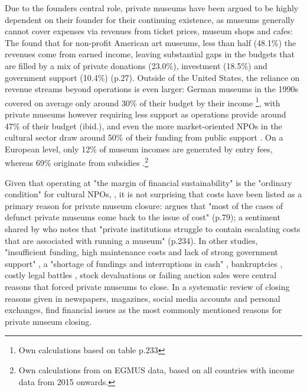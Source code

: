 \documentclass[12pt]{article}
\begin{document}
Due to the founders central role, private museums have been argued to be highly dependent on their founder for their continuing existence, as museums generally cannot cover expenses via revenues from ticket prices, museum shops and cafes:
The \textcite{IMLS_2008_funding} found that for non-profit American art museums, less than half (48.1\%) the revenues come from earned income, leaving substantial gaps in the budgets that are filled by a mix of private donations (23.0\%), investment (18.5\%) and government support (10.4\%) (p.27).
Outside of the United States, the reliance on revenue streams beyond operations is even larger:
German museums in the 1990s covered on average only around 30\% of their budget by their income \parencite{Martin_1993_museen}\footnote{Own calculations based on table p.233}, with private museums however requiring less support as operations provide around 47\% of their budget (ibid.), and even the more market-oriented NPOs in the cultural sector draw around 50\% of their funding from public support \parencite[p.82]{Zimmer_Priller_2007_gemeinnuetzig}.
On a European level, only 12\% of museum incomes are generated by entry fees, whereas 69\% originate from subsidies \parencite{EGMUS_2024_complete}.\footnote{Own calculations from on EGMUS data, based on all countries with income data from 2015 onwards.}


Given that operating at "the margin of financial sustainability" is the "ordinary condition" for cultural NPOs, \parencite[p.2]{Licci_BaraldiBonini_2024_sustainability}, it is not surprising that costs have been listed as a primary reason for private museum closure:
\textcite{Adam_2021_rise} argues that "most of the cases of defunct private museums come back to the issue of cost" (p.79); a sentiment shared by \textcite{Walker_2019_collector} who notes that "private institutions struggle to contain escalating costs that are associated with running a museum" (p.234).
In other studies, "insufficient funding, high maintenance costs and lack of strong government support" \parencite[p.7]{Zennaro_2017_shanghai}, a "shortage of fundings and interruptions in cash" \parencite[p.45]{Song_2008_private}, bankruptcies \parencite{Velthuis_Gera_2024_fragility,Liu_2019_identities,DeNigris_2018_museums}, costly legal battles \parencite{Velthuis_Gera_2024_fragility}, stock devaluations \parencite{Walker_2019_collector} or failing auction sales \parencite{Bechtler_Imhof_2018_future} were central reasons that forced private museums to close.
In a systematic review of closing reasons given in newspapers, magazines, social media accounts and personal exchanges, \textcite{Velthuis_Gera_2024_fragility} find financial issues as the most commonly mentioned reasons for private museum closing.
\end{document}
